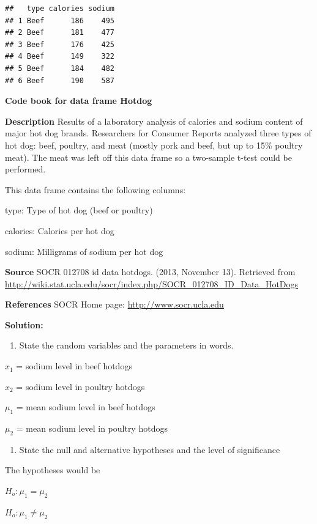 \documentclass[
]{book}
\providecommand{\tightlist}{%
  \setlength{\itemsep}{0pt}\setlength{\parskip}{0pt}}
\begin{document}
\begin{verbatim}
##   type calories sodium
## 1 Beef      186    495
## 2 Beef      181    477
## 3 Beef      176    425
## 4 Beef      149    322
## 5 Beef      184    482
## 6 Beef      190    587
\end{verbatim}

\textbf{Code book for data frame Hotdog}

\textbf{Description}
Results of a laboratory analysis of calories and sodium content of major hot dog brands. Researchers for Consumer Reports analyzed three types of hot dog: beef, poultry, and meat (mostly pork and beef, but up to 15\% poultry meat). The meat was left off this data frame so a two-sample t-test could be performed.

This data frame contains the following columns:

type: Type of hot dog (beef or poultry)

calories: Calories per hot dog

sodium: Milligrams of sodium per hot dog

\textbf{Source}
SOCR 012708 id data hotdogs. (2013, November 13). Retrieved from
\url{http://wiki.stat.ucla.edu/socr/index.php/SOCR_012708_ID_Data_HotDogs}

\textbf{References}
SOCR Home page: \url{http://www.socr.ucla.edu}

\textbf{Solution:}

\begin{enumerate}
\def\labelenumi{\arabic{enumi}.}
\tightlist
\item
  State the random variables and the parameters in words.
\end{enumerate}

\(x_1\) = sodium level in beef hotdogs

\(x_2\) = sodium level in poultry hotdogs

\(\mu_1\) = mean sodium level in beef hotdogs

\(\mu_2\) = mean sodium level in poultry hotdogs

\begin{enumerate}
\def\labelenumi{\arabic{enumi}.}
\setcounter{enumi}{1}
\tightlist
\item
  State the null and alternative hypotheses and the level of
  significance
\end{enumerate}

The hypotheses would be

\(H_o:\mu_1=\mu_2\)

\(H_o:\mu_1\ne \mu_2\)
\end{document}
